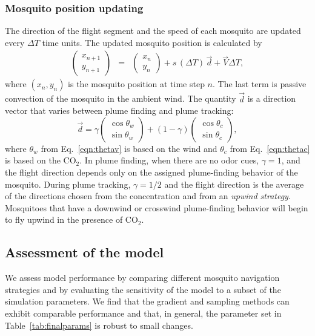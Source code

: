 \documentclass[10pt]{article}
\begin{document}
\subsubsection*{Mosquito position updating}
The direction of the flight segment and the speed of each mosquito are updated every $\Delta T$ time units. 
The updated mosquito position is calculated by
\begin{eqnarray*}
	\begin{pmatrix} x_{n+1} \\ y_{n+1} \end{pmatrix} &=&
	\begin{pmatrix} x_n \\ y_n \end{pmatrix} + s\,(\Delta T) \,\vec{d} + \vec{V}\Delta T , 
\end{eqnarray*}
where $(x_n,y_n)$ is the mosquito position at time step $n$. The last term is passive convection of the mosquito in the ambient wind. The quantity $\vec{d}$ is a direction vector that varies between plume finding and plume tracking: 
\begin{equation*}
	\vec{d} = \gamma\begin{pmatrix}  \cos{\theta_w}\\ \sin{\theta_w} \end{pmatrix} + (1-\gamma)\begin{pmatrix}  \cos{\theta_c}\\ \sin{\theta_c} \end{pmatrix},
\end{equation*}
where $\theta_w$ from Eq.~\eqref{eqn:thetav} is based on the wind and $\theta_c$ from Eq.~\eqref{eqn:thetac} is based on the CO$_2$. In plume finding, when there are no odor cues, $\gamma = 1$, and the flight direction depends only on the assigned plume-finding behavior of the mosquito. 
During plume tracking, $\gamma = 1/2$
and the flight direction is the average of the directions chosen from the concentration and from an \textit{upwind strategy}. Mosquitoes that have a downwind or crosswind plume-finding behavior will begin to fly upwind in the presence of CO$_2$. 


\subsection*{Assessment of the model}
We assess model performance by comparing 
different mosquito navigation strategies and by evaluating the sensitivity of the model to a subset of the 
simulation parameters.  We find that the gradient and sampling methods can exhibit comparable performance and that, in general, the parameter set in Table~\ref{tab:finalparams} is robust to small changes.
\end{document}
